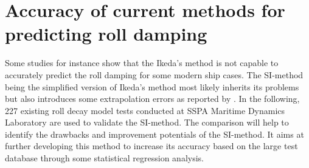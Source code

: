 \section{Accuracy of current methods for predicting roll damping}
\label{se:accuracy_SI_method}
Some studies for instance \parencite{soder_assessment_2019} show that the Ikeda's method is not capable to accurately predict the roll damping for some modern ship cases. The SI-method being the simplified version of Ikeda's method most likely inherits its problems but also introduces some extrapolation errors as reported by \parencite{rudakovic_application_2017}. In the following, 227 existing roll decay model tests conducted at SSPA Maritime Dynamics Laboratory are used to validate the SI-method. The comparison will help to identify the drawbacks and improvement potentials of the SI-method. It aims at further developing this method to increase its accuracy based on the large test database through some statistical regression analysis.






